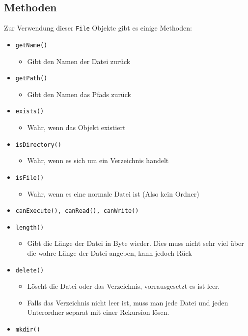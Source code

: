 \documentclass{article}
\begin{document}
	\subsection{Methoden}
	Zur Verwendung dieser \texttt{File} Objekte gibt es einige Methoden:
	\begin{itemize}
		\item{\texttt{getName()}}
		\begin{itemize}
			\item{Gibt den Namen der Datei zurück}
		\end{itemize}
		\item{\texttt{getPath()}}
		\begin{itemize}
			\item{Gibt den Namen das Pfads zurück}
		\end{itemize}
		\item{\texttt{exists()}}
		\begin{itemize}
			\item{Wahr, wenn das Objekt existiert}
		\end{itemize}
		\item{\texttt{isDirectory()}}
		\begin{itemize}
			\item{Wahr, wenn es sich um ein Verzeichnis handelt}
		\end{itemize}
		\item{\texttt{isFile()}}
		\begin{itemize}
			\item{Wahr, wenn es eine normale Datei ist (Also kein Ordner)}
		\end{itemize}
		\item{\texttt{canExecute(), canRead(), canWrite()}}
		\item{\texttt{length()}}
		\begin{itemize}
			\item{Gibt die Länge der Datei in Byte wieder. Dies muss nicht sehr viel über die wahre Länge der Datei angeben, kann jedoch Rück}
		\end{itemize}
		\item{\texttt{delete()}}
		\begin{itemize}
			\item{Löscht die Datei oder das Verzeichnis, vorrausgesetzt es ist leer.}
			\item{Falls das Verzeichnis nicht leer ist, muss man jede Datei und jeden Unterordner separat mit einer Rekursion lösen.}
		\end{itemize}
		\item{\texttt{mkdir()}}

\end{itemize}
\end{document}
